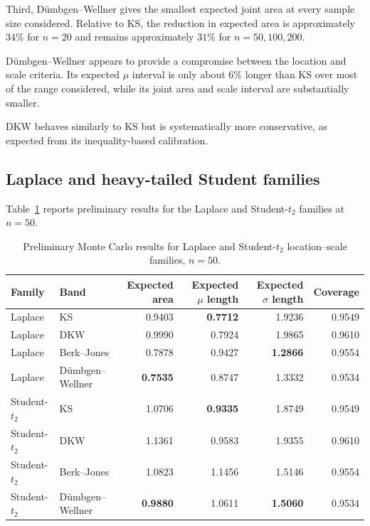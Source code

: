 \documentclass[11pt]{article}
\begin{document}
Third, Dümbgen--Wellner gives the smallest expected joint area at every
sample size considered.  Relative to KS, the reduction in expected area
is approximately $34\%$ for $n=20$ and remains approximately
$31\%$ for $n=50,100,200$.

Dümbgen--Wellner appears to provide a compromise between the location
and scale criteria.  Its expected $\mu$ interval is only about
$6\%$ longer than KS over most of the range considered, while its joint
area and scale interval are substantially smaller.

DKW behaves similarly to KS but is systematically more conservative,
as expected from its inequality-based calibration.


\subsection{Laplace and heavy-tailed Student families}

Table~\ref{tab:otherfamilies} reports preliminary results for the
Laplace and Student-$t_2$ families at $n=50$.

\begin{table}[htbp]
\centering
\small
\caption{
Preliminary Monte Carlo results for Laplace and Student-$t_2$
location--scale families, $n=50$.
}
\label{tab:otherfamilies}
\begin{tabular}{
    l
    l
    r
    r
    r
    r
}
\toprule
Family
&
Band
&
Expected area
&
Expected $\mu$ length
&
Expected $\sigma$ length
&
Coverage
\\
\midrule
Laplace
& KS
& 0.9403
& \textbf{0.7712}
& 1.9236
& 0.9549
\\
Laplace
& DKW
& 0.9990
& 0.7924
& 1.9865
& 0.9610
\\
Laplace
& Berk--Jones
& 0.7878
& 0.9427
& \textbf{1.2866}
& 0.9554
\\
Laplace
& Dümbgen--Wellner
& \textbf{0.7535}
& 0.8747
& 1.3332
& 0.9534
\\
\addlinespace

Student-$t_2$
& KS
& 1.0706
& \textbf{0.9335}
& 1.8749
& 0.9549
\\
Student-$t_2$
& DKW
& 1.1361
& 0.9583
& 1.9355
& 0.9610
\\
Student-$t_2$
& Berk--Jones
& 1.0823
& 1.1456
& 1.5146
& 0.9554
\\
Student-$t_2$
& Dümbgen--Wellner
& \textbf{0.9880}
& 1.0611
& \textbf{1.5060}
& 0.9534
\\
\bottomrule
\end{tabular}
\end{table}
\end{document}

